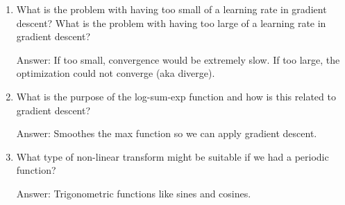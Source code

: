 \documentclass{article}
\def\ans#1{\par\gre{Answer: #1}}
\def\gre#1{{\color{gre}#1}}
\begin{document}
{\begin{enumerate}
\item What is the problem with having too small of a learning rate in gradient descent? What is the problem with having too large of a learning rate in gradient descent?
\ans{If too small, convergence would be extremely slow. If too large, the optimization could not converge (aka diverge).}
\item What is the purpose of the log-sum-exp function and how is this related to gradient descent?
\ans{Smoothes the max function so we can apply gradient descent.}
\item What type of non-linear transform might be suitable if we had a periodic function?
\ans{Trigonometric functions like sines and cosines.}
\end{enumerate}
}
\end{document}
